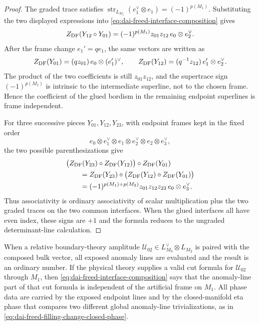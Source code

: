 \begin{proof}
The graded trace satisfies
\(\operatorname{str}_{L_{M_1}}(e_1^\vee\otimes e_1)=(-1)^{p(M_1)}\).
Substituting the two displayed expressions into
\eqref{eq:dai-freed-interface-composition} gives
\[
  Z_{\rm DF}(Y_{12}\circ Y_{01})
  =
  (-1)^{p(M_1)}z_{01}z_{12}\,e_0\otimes e_2^\vee.
\]
After the frame change \(e_1'=q e_1\), the same vectors are written as
\[
  Z_{\rm DF}(Y_{01})=(qz_{01})\,e_0\otimes (e_1')^\vee,
  \qquad
  Z_{\rm DF}(Y_{12})=(q^{-1}z_{12})\,e_1'\otimes e_2^\vee.
\]
The product of the two coefficients is still \(z_{01}z_{12}\), and the
supertrace sign \((-1)^{p(M_1)}\) is intrinsic to the intermediate
superline, not to the chosen frame.  Hence the coefficient of the glued
bordism in the remaining endpoint superlines is frame independent.

For three successive pieces \(Y_{01},Y_{12},Y_{23}\), with endpoint frames
kept in the fixed order
\[
  e_0\otimes e_1^\vee\otimes e_1\otimes e_2^\vee
  \otimes e_2\otimes e_3^\vee,
\]
the two possible parenthesizations give
\begin{align*}
  &\bigl(Z_{\rm DF}(Y_{23})\circ Z_{\rm DF}(Y_{12})\bigr)\circ
  Z_{\rm DF}(Y_{01}) \\
  &\qquad =
  Z_{\rm DF}(Y_{23})\circ
  \bigl(Z_{\rm DF}(Y_{12})\circ Z_{\rm DF}(Y_{01})\bigr) \\
  &\qquad =
  (-1)^{p(M_1)+p(M_2)}z_{01}z_{12}z_{23}\,
  e_0\otimes e_3^\vee .
\end{align*}
Thus associativity is ordinary associativity of scalar multiplication plus
the two graded traces on the two common interfaces.  When the glued
interfaces all have even index, these signs are \(+1\) and the formula
reduces to the ungraded determinant-line calculation.
\end{proof}

When a relative boundary-theory amplitude
\(\mathcal U_{02}\in L_{M_0}^\vee\otimes L_{M_2}\) is paired with the
composed bulk vector, all exposed anomaly lines are evaluated and the result
is an ordinary number.  If the physical theory supplies a valid cut formula
for \(\mathcal U_{02}\) through \(M_1\), then
\eqref{eq:dai-freed-interface-composition} says that the anomaly-line part of
that cut formula is independent of the artificial frame on \(M_1\).  All
phase data are carried by the exposed endpoint lines and by the
closed-manifold eta phase that compares two different global anomaly-line
trivializations, as in \eqref{eq:dai-freed-filling-change-closed-phase}.


